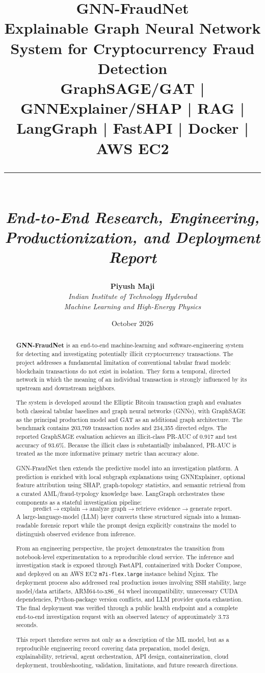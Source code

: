 \documentclass[11pt,a4paper]{report}
\title{
  \vspace{0.8cm}
  {\Huge \textbf{GNN-FraudNet}}\\[0.55cm]
  {\Large \textbf{Explainable Graph Neural Network System for Cryptocurrency Fraud Detection}}\\[0.45cm]
  {\large GraphSAGE/GAT \;|\; GNNExplainer/SHAP \;|\; RAG \;|\; LangGraph \;|\; FastAPI \;|\; Docker \;|\; AWS EC2}\\[1.0cm]
  \rule{\textwidth}{0.6pt}\\[0.35cm]
  {\large \textit{End-to-End Research, Engineering, Productionization, and Deployment Report}}\\[1.4cm]
}
\author{
  \textbf{Piyush Maji}\\
  \textit{Indian Institute of Technology Hyderabad}\\
  \textit{Machine Learning and High-Energy Physics}\\[0.8cm]
}
\date{October 2026}
\begin{document}
\maketitle

\begin{abstract}
\textbf{GNN-FraudNet} is an end-to-end machine-learning and software-engineering system for detecting and investigating potentially illicit cryptocurrency transactions. The project addresses a fundamental limitation of conventional tabular fraud models: blockchain transactions do not exist in isolation. They form a temporal, directed network in which the meaning of an individual transaction is strongly influenced by its upstream and downstream neighbors.

The system is developed around the Elliptic Bitcoin transaction graph and evaluates both classical tabular baselines and graph neural networks (GNNs), with GraphSAGE as the principal production model and GAT as an additional graph architecture. The benchmark contains 203,769 transaction nodes and 234,355 directed edges. The reported GraphSAGE evaluation achieves an illicit-class PR-AUC of 0.917 and test accuracy of 93.6\%. Because the illicit class is substantially imbalanced, PR-AUC is treated as the more informative primary metric than accuracy alone.

GNN-FraudNet then extends the predictive model into an investigation platform. A prediction is enriched with local subgraph explanations using GNNExplainer, optional feature attribution using SHAP, graph-topology statistics, and semantic retrieval from a curated AML/fraud-typology knowledge base. LangGraph orchestrates these components as a stateful investigation pipeline:
\[
\text{predict}
\rightarrow
\text{explain}
\rightarrow
\text{analyze graph}
\rightarrow
\text{retrieve evidence}
\rightarrow
\text{generate report}.
\]
A large-language-model (LLM) layer converts these structured signals into a human-readable forensic report while the prompt design explicitly constrains the model to distinguish observed evidence from inference.

From an engineering perspective, the project demonstrates the transition from notebook-level experimentation to a reproducible cloud service. The inference and investigation stack is exposed through FastAPI, containerized with Docker Compose, and deployed on an AWS EC2 \texttt{m7i-flex.large} instance behind Nginx. The deployment process also addressed real production issues involving SSH stability, large model/data artifacts, ARM64-to-x86\_64 wheel incompatibility, unnecessary CUDA dependencies, Python-package version conflicts, and LLM provider quota exhaustion. The final deployment was verified through a public health endpoint and a complete end-to-end investigation request with an observed latency of approximately 3.73 seconds.

This report therefore serves not only as a description of the ML model, but as a reproducible engineering record covering data preparation, model design, explainability, retrieval, agent orchestration, API design, containerization, cloud deployment, troubleshooting, validation, limitations, and future research directions.
\end{abstract}
\end{document}
